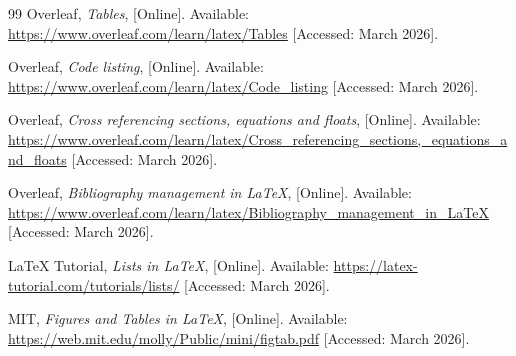 \documentclass[12pt, a4paper]{report}
\begin{document}
\begin{thebibliography}{99}
Overleaf, \textit{Tables}, [Online]. Available: \url{https://www.overleaf.com/learn/latex/Tables} [Accessed: March 2026].

Overleaf, \textit{Code listing}, [Online]. Available: \url{https://www.overleaf.com/learn/latex/Code_listing} [Accessed: March 2026].

Overleaf, \textit{Cross referencing sections, equations and floats}, [Online]. Available: \url{https://www.overleaf.com/learn/latex/Cross_referencing_sections,_equations_and_floats} [Accessed: March 2026].

Overleaf, \textit{Bibliography management in LaTeX}, [Online]. Available: \url{https://www.overleaf.com/learn/latex/Bibliography_management_in_LaTeX} [Accessed: March 2026].

LaTeX Tutorial, \textit{Lists in LaTeX}, [Online]. Available: \url{https://latex-tutorial.com/tutorials/lists/} [Accessed: March 2026].

MIT, \textit{Figures and Tables in LaTeX}, [Online]. Available: \url{https://web.mit.edu/molly/Public/mini/figtab.pdf} [Accessed: March 2026].

\end{thebibliography}
\end{document}
